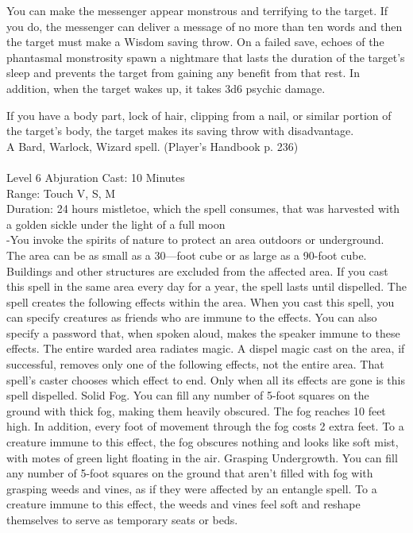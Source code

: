 \documentclass[10pt,twocolumn]{report}
\begin{document}
You can make the messenger appear monstrous and terrifying to the target. If you do, the messenger can deliver a message of no more than ten words and then the target must make a Wisdom saving throw. On a failed save, echoes of the phantasmal monstrosity spawn a nightmare that lasts the duration of the target’s sleep and prevents the target from gaining any benefit from that rest. In addition, when the target wakes up, it takes 3d6 psychic damage. 

If you have a body part, lock of hair, clipping from a nail, or similar portion of the target’s body, the target makes its saving throw with disadvantage.\\
A Bard, Warlock, Wizard spell. (Player's Handbook p. 236) \\


 \\
Level 6 \quad Abjuration \quad Cast: 10 Minutes\\
Range: Touch \quad V, S, M\\
Duration: 24 hours \quad mistletoe, which the spell consumes, that was harvested with a golden sickle under the light of a full moon\\
-You invoke the spirits of nature to protect an area outdoors or underground. The area can be as small as a 30—foot cube or as large as a 90-foot cube. Buildings and other structures are excluded from the affected area. If you cast this spell in the same area every day for a year, the spell lasts until dispelled. The spell creates the following effects within the area. When you cast this spell, you can specify creatures as friends who are immune to the effects. You can also specify a password that, when spoken aloud, makes the speaker immune to these effects. The entire warded area radiates magic. A dispel magic cast on the area, if successful, removes only one of the following effects, not the entire area. That spell’s caster chooses which effect to end. Only when all its effects are gone is this spell dispelled.
Solid Fog. You can fill any number of 5-foot squares on the ground with thick fog, making them heavily obscured. The fog reaches 10 feet high. In addition, every foot of movement through the fog costs 2 extra feet. To a creature immune to this effect, the fog obscures nothing and looks like soft mist, with motes of green light floating in the air.
Grasping Undergrowth. You can fill any number of 5-foot squares on the ground that aren’t filled with fog with grasping weeds and vines, as if they were affected by an entangle spell. To a creature immune to this effect, the weeds and vines feel soft and reshape themselves to serve as temporary seats or beds.
\end{document}

